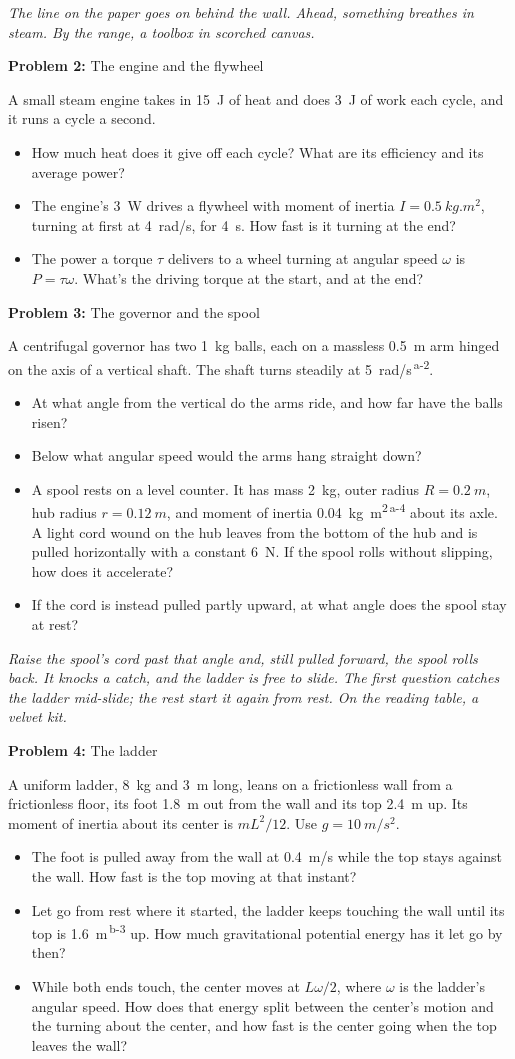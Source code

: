 \documentclass[11pt]{article}
\newcommand{\room}[1]{\par\bigskip{\large\bfseries #1}\par\nopagebreak\smallskip}
\newcommand{\scene}[1]{\par{\itshape #1}\par}
\newcommand{\problem}[2]{\par\medskip\textbf{Problem #1:} #2\par\nopagebreak}
\newenvironment{parts}{\begin{itemize}[leftmargin=3.4em,labelwidth=2.8em,labelsep=0.6em,align=left,itemsep=2pt,topsep=3pt]}{\end{itemize}}
\newcommand{\pt}[1]{\item[\textbf{#1}]}
\newcommand{\sv}[1]{\textsuperscript{\dag\,#1}}
\begin{document}
\room{Kitchen}
\scene{The line on the paper goes on behind the wall. Ahead, something breathes in steam. By the range, a toolbox in scorched canvas.}
\problem{2}{The engine and the flywheel}
A small steam engine takes in \SI{15}{J} of heat and does \SI{3}{J} of work each cycle, and it runs a cycle a second.
\begin{parts}
\pt{2-a} How much heat does it give off each cycle? What are its efficiency and its average power?
\pt{2-b} The engine's \SI{3}{W} drives a flywheel with moment of inertia $I = \SI{0.5}{kg.m^2}$, turning at first at \SI{4}{rad/s}, for \SI{4}{s}. How fast is it turning at the end?
\pt{2-c} The power a torque $\tau$ delivers to a wheel turning at angular speed $\omega$ is $P = \tau\omega$. What's the driving torque at the start, and at the end?
\end{parts}

\problem{3}{The governor and the spool}
A centrifugal governor has two \SI{1}{kg} balls, each on a massless \SI{0.5}{m} arm hinged on the axis of a vertical shaft. The shaft turns steadily at \SI{5}{rad/s}\sv{a-2}.
\begin{parts}
\pt{3-a} At what angle from the vertical do the arms ride, and how far have the balls risen?
\pt{3-b} Below what angular speed would the arms hang straight down?
\pt{3-c} A spool rests on a level counter. It has mass \SI{2}{kg}, outer radius $R = \SI{0.2}{m}$, hub radius $r = \SI{0.12}{m}$, and moment of inertia \SI{0.04}{kg.m^2}\sv{a-4} about its axle. A light cord wound on the hub leaves from the bottom of the hub and is pulled horizontally with a constant \SI{6}{N}. If the spool rolls without slipping, how does it accelerate?
\pt{3-d} If the cord is instead pulled partly upward, at what angle does the spool stay at rest?
\end{parts}

\room{Library}
\scene{Raise the spool's cord past that angle and, still pulled forward, the spool rolls back. It knocks a catch, and the ladder is free to slide. The first question catches the ladder mid-slide; the rest start it again from rest. On the reading table, a velvet kit.}
\problem{4}{The ladder}
A uniform ladder, \SI{8}{kg} and \SI{3}{m} long, leans on a frictionless wall from a frictionless floor, its foot \SI{1.8}{m} out from the wall and its top \SI{2.4}{m} up. Its moment of inertia about its center is $mL^2/12$. Use $g = \SI{10}{m/s^2}$.
\begin{parts}
\pt{4-a} The foot is pulled away from the wall at \SI{0.4}{m/s} while the top stays against the wall. How fast is the top moving at that instant?
\pt{4-b} Let go from rest where it started, the ladder keeps touching the wall until its top is \SI{1.6}{m}\sv{b-3} up. How much gravitational potential energy has it let go by then?
\pt{4-c} While both ends touch, the center moves at $L\omega/2$, where $\omega$ is the ladder's angular speed. How does that energy split between the center's motion and the turning about the center, and how fast is the center going when the top leaves the wall?
\end{parts}
\end{document}
